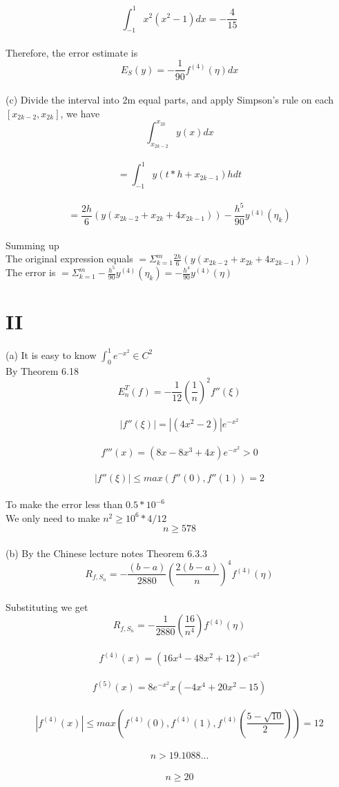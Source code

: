 \documentclass[a4paper]{article}
\begin{document}
\[ \int_{-1}^{1} x^2(x^2-1) dx = -\frac{4}{15} \]\\
Therefore, the error estimate is\\
\[ E_S(y) = -\frac{1}{90}f^{(4)}(\eta)dx \]\\
(c)
Divide the interval into 2m equal parts, and apply Simpson's rule on each \([x_{2k-2},x_{2k}]\), we have\\
\[ \int_{x_{2k-2}}^{x_{2k}}y(x)dx \]\\
\[ =\int_{-1}^{1}y(t*h+x_{2k-1})hdt \]\\
\[ =\frac{2h}{6}(y(x_{2k-2}+x_{2k}+4x_{2k-1}))-\frac{h^5}{90}y^{(4)}(\eta_{k}) \]\\
Summing up\\
The original expression equals \(=\Sigma_{k=1}^{m}\frac{2h}{6}(y(x_{2k-2}+x_{2k}+4x_{2k-1}))\)\\
The error is \(=\Sigma_{k=1}^{m}-\frac{h^5}{90}y^{(4)}(\eta_{k})=-\frac{h^4}{90}y^{(4)}(\eta)\)\\
\section*{II}

(a) It is easy to know \(\int_{0}^{1}e^{-x^2}\in C^2\)\\
By Theorem 6.18\\
\[ E_n^T(f)=-\frac{1}{12}(\frac{1}{n})^2f''(\xi) \]\\
\[ |f''(\xi)| =|(4x^2-2)|e^{-x^2} \]\\
\[ f'''(x)=(8x-8x^3+4x)e^{-x^2}>0 \]\\
\[ |f''(\xi)|\leq max(f''(0),f''(1))=2 \]\\
To make the error less than \(0.5*10^{-6}\)\\
We only need to make \(n^2\geq 10^6*4/12\)\\
\[ n\geq 578 \]\\
(b)
By the Chinese lecture notes Theorem 6.3.3\\
\[ R_{f,S_n}=-\frac{(b-a)}{2880}(\frac{2(b-a)}{n})^4f^{(4)}(\eta) \]\\
Substituting we get\\
\[ R_{f,S_n}=-\frac{1}{2880}(\frac{16}{n^4})f^{(4)}(\eta) \]\\
\[ f^{(4)}(x)=(16x^4-48x^2+12)e^{-x^2} \]\\
\[ f^{(5)}(x)=8e^{-x^2}x(-4x^4+20x^2-15) \]\\
\[ |f^{(4)}(x)|\leq max(f^{(4)}(0),f^{(4)}(1),f^{(4)}(\frac{5-\sqrt{10}}{2}))=12 \]\\
\[ n>19.1088... \]\\
\[ n \geq 20 \]\
\end{document}
